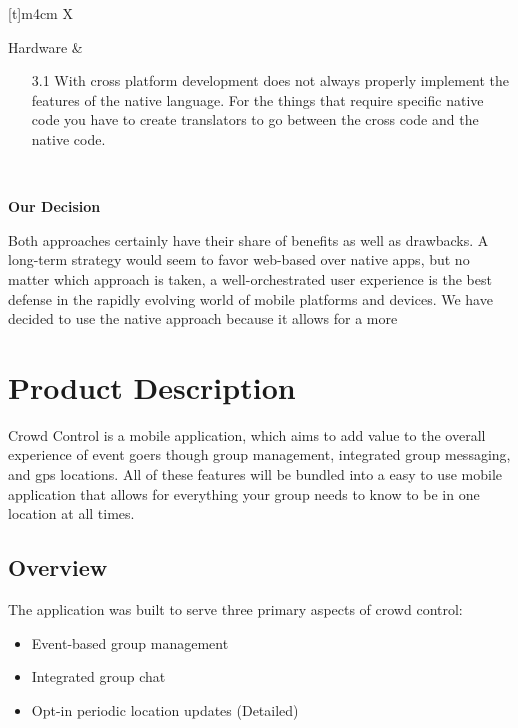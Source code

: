 \begin{center}
\begin{tabularx}{\textwidth}[t]{m{4cm} X}
\hline
{} \\
\hline

Hardware &
\begin{minipage}[t]{\linewidth}%
\begin{itemize}
\item[3.1] With cross platform development does not always properly implement the features of the native language. For the things that require specific native code you have to create translators to go between the cross code and the native code.
\end{itemize} 
\end{minipage}\\


\end{tabularx}
\end{center}

\noindent
\textbf{Our Decision}

Both approaches certainly have their share of benefits as well as drawbacks. A long-term strategy would seem to favor web-based over native apps, but no matter which approach is taken, a well-orchestrated user experience is the best defense in the rapidly evolving world of mobile platforms and devices. We have decided to use the native approach because it allows for a more 

\section{Product Description}

Crowd Control is a mobile application, which aims to add value to the overall experience of event goers though group management, integrated group messaging, and gps locations. All of these features will be bundled into a easy to use mobile application that allows for everything your group needs to know to be in one location at all times.

\subsection{Overview}

The application was built to serve three primary aspects of crowd control: 
\begin{itemize}
\item Event-based group management
\item Integrated group chat
\item Opt-in periodic location updates
         (Detailed)
\end{itemize}

